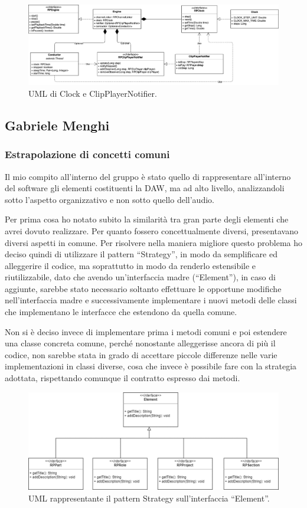 \documentclass[a4paper,12pt]{report}
\begin{document}
\begin{figure}[H]
\centering{}
\includegraphics[width=\textwidth]{img/clock.png}
\caption{UML di Clock e ClipPlayerNotifier.}
\end{figure}

\subsection{Gabriele Menghi}
\subsubsection{Estrapolazione di concetti comuni}
Il mio compito all’interno del gruppo è stato quello di rappresentare all’interno del software gli elementi costituenti la DAW, ma ad alto livello, analizzandoli sotto l’aspetto organizzativo e non sotto quello dell’audio.

Per prima cosa ho notato subito la similarità tra gran parte degli elementi che avrei dovuto realizzare. Per quanto fossero concettualmente diversi, presentavano diversi aspetti in comune. Per risolvere nella maniera migliore questo problema ho deciso quindi di utilizzare il pattern “Strategy”, in modo da semplificare ed alleggerire il codice, ma soprattutto in modo da renderlo estensibile e riutilizzabile, dato che avendo un’interfaccia madre (“Element”), in caso di aggiunte, sarebbe stato necessario soltanto effettuare le opportune modifiche nell’interfaccia madre e successivamente implementare i nuovi metodi delle classi che implementano le interfacce che estendono da quella comune.

Non si è deciso invece di implementare prima i metodi  comuni e poi estendere una classe concreta comune, perché nonostante alleggerisse ancora di più il codice, non sarebbe stata in grado di accettare piccole differenze nelle varie implementazioni in classi diverse, cosa che invece è possibile fare con la strategia adottata, rispettando comunque il contratto espresso dai metodi. 

\begin{figure}[h]
\centering{}
\includegraphics[width=\textwidth,scale=1]{img/element.png}
\caption{UML rappresentante il pattern Strategy sull’interfaccia “Element”.}
\end{figure}
\end{document}
